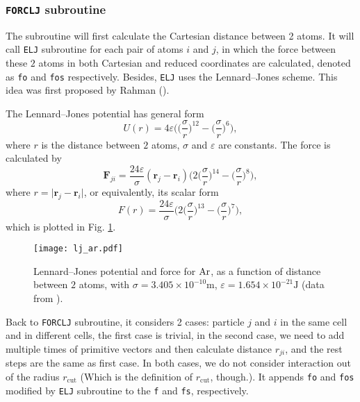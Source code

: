 
\subsubsection{\texttt{FORCLJ} subroutine}
\label{sssec:forclj}

The subroutine will first calculate the Cartesian distance between 2 atoms.
It will call \texttt{ELJ} subroutine for each pair of atoms $i$ and $j$, in which
the force between these $2$ atoms in both Cartesian and reduced coordinates
are calculated, denoted as \texttt{fo} and \texttt{fos} respectively.
Besides, \texttt{ELJ} uses the Lennard--Jones scheme. This idea was first proposed by
Rahman (\cite{rahman1964correlations}).

The Lennard--Jones potential has general form
\begin{equation}
	U(r) = 4\varepsilon \bigg( \Big( \frac{ \sigma }{ r } \Big) ^ {12} -
	\Big( \frac{ \sigma }{ r } \Big) ^ 6 \bigg),
\end{equation}
where $r$ is the distance between $2$ atoms, $\sigma$ and $\varepsilon$
are constants.
The force is calculated by
\begin{equation}
	\bm{F}_{ji} = \frac{ 24\varepsilon }{ \sigma } (\bm{r}_j - \bm{r}_i)
	\bigg( 2\Big( \frac{ \sigma }{ r } \Big) ^ {14} -
	\Big( \frac{ \sigma }{ r } \Big) ^ 8 \bigg),
\end{equation}
where $r = \lvert \bm{r}_j - \bm{r}_i \rvert$, or equivalently, its scalar form
\begin{equation}
	F(r) = \frac{ 24\varepsilon }{ \sigma }
	\bigg( 2\Big( \frac{ \sigma }{ r } \Big) ^ {13} -
	\Big( \frac{ \sigma }{ r } \Big) ^ 7 \bigg),
\end{equation}
which is plotted in Fig. \ref{fig:ljar}.

\begin{figure}[h]
	\centering
	\texttt{[image: lj\_ar.pdf]}
	\caption{Lennard--Jones potential and force for $\ce{Ar}$, as a function of
		distance between $2$ atoms, with
		$\sigma=3.405\times 10^{-10}\si{\meter}$,
		$\varepsilon = 1.654\times 10^{-21}\si{\joule}$ (data from \cite{buffalomd}).}
	\label{fig:ljar}
\end{figure}

Back to \texttt{FORCLJ} subroutine,
it considers 2 cases: particle $j$ and $i$ in the same cell and
in different cells, the first case is trivial, in the second case,
we need to add multiple times of primitive vectors and then calculate distance
$r_{ji}$, and the rest steps are the same as first case. In both cases, we do not
consider interaction out of the radius $r_{\text{cut}}$ (Which is the definition of 
$r_\text{cut}$, though.).
It appends \texttt{fo} and \texttt{fos} modified by \texttt{ELJ}
subroutine to the \texttt{f} and \texttt{fs}, respectively.
